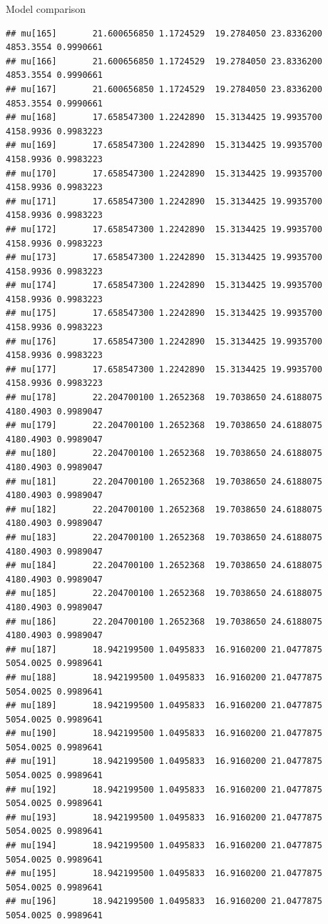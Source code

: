 \documentclass[
  ignorenonframetext,
]{beamer}
\begin{document}
\begin{frame}[fragile]{Model comparison}
\begin{verbatim}
## mu[165]       21.600656850 1.1724529  19.2784050 23.8336200 4853.3554 0.9990661
## mu[166]       21.600656850 1.1724529  19.2784050 23.8336200 4853.3554 0.9990661
## mu[167]       21.600656850 1.1724529  19.2784050 23.8336200 4853.3554 0.9990661
## mu[168]       17.658547300 1.2242890  15.3134425 19.9935700 4158.9936 0.9983223
## mu[169]       17.658547300 1.2242890  15.3134425 19.9935700 4158.9936 0.9983223
## mu[170]       17.658547300 1.2242890  15.3134425 19.9935700 4158.9936 0.9983223
## mu[171]       17.658547300 1.2242890  15.3134425 19.9935700 4158.9936 0.9983223
## mu[172]       17.658547300 1.2242890  15.3134425 19.9935700 4158.9936 0.9983223
## mu[173]       17.658547300 1.2242890  15.3134425 19.9935700 4158.9936 0.9983223
## mu[174]       17.658547300 1.2242890  15.3134425 19.9935700 4158.9936 0.9983223
## mu[175]       17.658547300 1.2242890  15.3134425 19.9935700 4158.9936 0.9983223
## mu[176]       17.658547300 1.2242890  15.3134425 19.9935700 4158.9936 0.9983223
## mu[177]       17.658547300 1.2242890  15.3134425 19.9935700 4158.9936 0.9983223
## mu[178]       22.204700100 1.2652368  19.7038650 24.6188075 4180.4903 0.9989047
## mu[179]       22.204700100 1.2652368  19.7038650 24.6188075 4180.4903 0.9989047
## mu[180]       22.204700100 1.2652368  19.7038650 24.6188075 4180.4903 0.9989047
## mu[181]       22.204700100 1.2652368  19.7038650 24.6188075 4180.4903 0.9989047
## mu[182]       22.204700100 1.2652368  19.7038650 24.6188075 4180.4903 0.9989047
## mu[183]       22.204700100 1.2652368  19.7038650 24.6188075 4180.4903 0.9989047
## mu[184]       22.204700100 1.2652368  19.7038650 24.6188075 4180.4903 0.9989047
## mu[185]       22.204700100 1.2652368  19.7038650 24.6188075 4180.4903 0.9989047
## mu[186]       22.204700100 1.2652368  19.7038650 24.6188075 4180.4903 0.9989047
## mu[187]       18.942199500 1.0495833  16.9160200 21.0477875 5054.0025 0.9989641
## mu[188]       18.942199500 1.0495833  16.9160200 21.0477875 5054.0025 0.9989641
## mu[189]       18.942199500 1.0495833  16.9160200 21.0477875 5054.0025 0.9989641
## mu[190]       18.942199500 1.0495833  16.9160200 21.0477875 5054.0025 0.9989641
## mu[191]       18.942199500 1.0495833  16.9160200 21.0477875 5054.0025 0.9989641
## mu[192]       18.942199500 1.0495833  16.9160200 21.0477875 5054.0025 0.9989641
## mu[193]       18.942199500 1.0495833  16.9160200 21.0477875 5054.0025 0.9989641
## mu[194]       18.942199500 1.0495833  16.9160200 21.0477875 5054.0025 0.9989641
## mu[195]       18.942199500 1.0495833  16.9160200 21.0477875 5054.0025 0.9989641
## mu[196]       18.942199500 1.0495833  16.9160200 21.0477875 5054.0025 0.9989641

\end{verbatim}
\end{frame}
\end{document}
